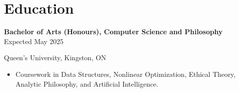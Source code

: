 \renewcommand{\subsection}[3]{
    \noindent\textbf{#1}  \emph{#2} \hfill #3 \break
}

\section{Education}
\subsection{Bachelor of Arts (Honours), Computer Science and Philosophy}{}{Expected May 2025}
Queen's University, Kingston, ON %
\begin{itemize}
    \item Coursework in Data Structures, Nonlinear Optimization, Ethical Theory, Analytic Philosophy, and Artificial Intelligence.
\end{itemize}
\vspace{0.2em}
